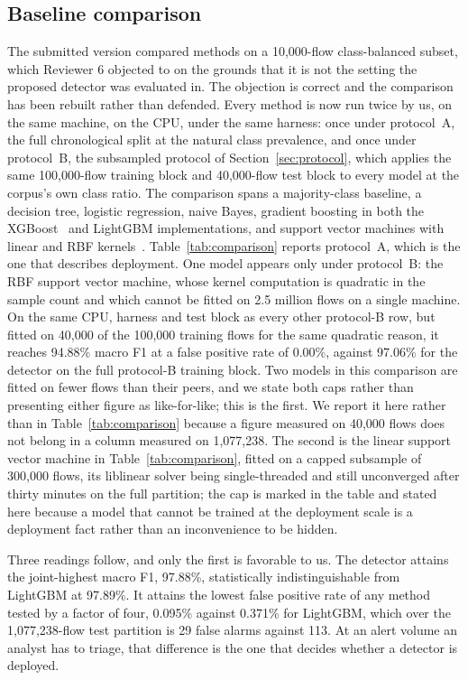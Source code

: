 \documentclass{ieeeaccess}
\begin{document}
\subsection{Baseline comparison}
\label{sec:baselines}
The submitted version compared methods on a 10,000-flow class-balanced subset,
which Reviewer 6 objected to on the grounds that it is not the setting the
proposed detector was evaluated in. The objection is correct and the comparison
has been rebuilt rather than defended. Every method is now run twice by us, on
the same machine, on the CPU, under the same harness: once under protocol~A, the
full chronological split at the natural class prevalence, and once under
protocol~B, the subsampled protocol of Section~\ref{sec:protocol}, which applies
the same 100,000-flow training block and 40,000-flow test block to every model at
the corpus's own class ratio. The comparison spans a majority-class baseline, a
decision tree, logistic regression, naive Bayes, gradient boosting in both the
XGBoost~\cite{chen2016xgboost} and LightGBM implementations, and support vector
machines with linear and RBF kernels~\cite{cortes1995svm}.
Table~\ref{tab:comparison} reports protocol~A, which is the one that describes
deployment. One model appears only under protocol~B: the RBF support vector
machine, whose kernel computation is quadratic in the sample count and which
cannot be fitted on 2.5 million flows on a single machine. On the same CPU,
harness and test block as every other protocol-B row, but fitted on 40,000 of the
100,000 training flows for the same quadratic reason, it reaches 94.88\% macro F1
at a false positive rate of 0.00\%, against 97.06\% for the detector on the full
protocol-B training block. Two models in this comparison are fitted on fewer
flows than their peers, and we state both caps rather than presenting either
figure as like-for-like; this is the first. We report it here rather than in
Table~\ref{tab:comparison}
because a figure measured on 40,000 flows does not belong in a column measured on
1,077,238. The second is the linear support vector machine in
Table~\ref{tab:comparison}, fitted on a capped subsample of 300,000 flows, its
liblinear solver being single-threaded and still unconverged after thirty minutes
on the full partition; the cap is marked in the table and stated here because a
model that cannot be trained at the deployment scale is a deployment fact rather
than an inconvenience to be hidden.

Three readings follow, and only the first is favorable to us. The detector
attains the joint-highest macro F1, 97.88\%, statistically indistinguishable
from LightGBM at 97.89\%. It attains the lowest false positive rate of any
method tested by a factor of four, 0.095\% against 0.371\% for LightGBM, which
over the 1,077,238-flow test partition is 29 false alarms against 113. At an
alert volume an analyst has to triage, that difference is the one that decides
whether a detector is deployed.
\end{document}
